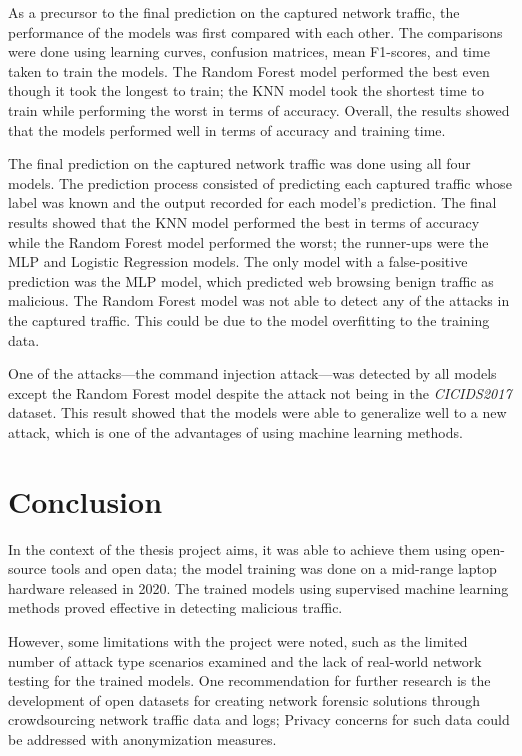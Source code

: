 \documentclass[12pt, a4paper]{article}
\begin{document}
    As a precursor to the final prediction on the captured network traffic, the performance of the models was first compared with each other.
    The comparisons were done using learning curves, confusion matrices, mean F1-scores, and time taken to train the models.
    The Random Forest model performed the best even though it took the longest to train;
   the KNN model took the shortest time to train while performing the worst in terms of accuracy.
    Overall, the results showed that the models performed well in terms of accuracy and training time.

    The final prediction on the captured network traffic was done using all four models.
    The prediction process consisted of predicting each captured traffic whose label was known and the output recorded for each model's prediction.
    The final results showed that the KNN model performed the best in terms of accuracy while the Random Forest model performed the worst;
    the runner-ups were the MLP and Logistic Regression models.
    The only model with a false-positive prediction was the MLP model, which predicted web browsing benign traffic as malicious.
    The Random Forest model was not able to detect any of the attacks in the captured traffic.
    This could be due to the model overfitting to the training data.

    \clearpage

    One of the attacks---the command injection attack---was detected by all models except the Random Forest model despite the attack not being in the \textit{CICIDS2017} dataset.
    This result showed that the models were able to generalize well to a new attack, which is one of the advantages of using machine learning methods.


    \section{Conclusion}\label{sec:conclusion}

    In the context of the thesis project aims, it was able to achieve them using open-source tools and open data;
    the model training was done on a mid-range laptop hardware released in 2020.
    The trained models using supervised machine learning methods proved effective in detecting malicious traffic.

    However, some limitations with the project were noted, such as the limited number of attack type scenarios examined and the lack of real-world network testing for the trained models.
    One recommendation for further research is the development of open datasets for creating network forensic solutions through crowdsourcing network traffic data and logs;
    Privacy concerns for such data could be addressed with anonymization measures.
\end{document}
